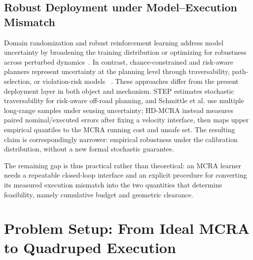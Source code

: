 \documentclass{article}
\begin{document}
\subsection{Robust Deployment under Model--Execution Mismatch}
Domain randomization and robust reinforcement learning address model uncertainty by
broadening the training distribution or optimizing for robustness across perturbed
dynamics~\citep{tobin2017,smirnova2019,wang2021,liu2022drql}. In contrast,
chance-constrained and risk-aware planners represent uncertainty at the planning
level through traversability, path-selection, or violation-risk models
~\citep{theurkauf2023,fan2021step,schmittle2024}. These approaches differ from the
present deployment layer in both object and mechanism. STEP estimates stochastic
traversability for risk-aware off-road planning, and Schmittle et al. use multiple
long-range samples under sensing uncertainty; HD-MCRA instead measures paired
nominal/executed errors after fixing a velocity interface, then maps upper empirical
quantiles to the MCRA running cost and unsafe set. The resulting claim is
correspondingly narrower: empirical robustness under the calibration distribution,
without a new formal stochastic guarantee.

The remaining gap is thus practical rather than theoretical: an MCRA learner needs
a repeatable closed-loop interface and an explicit procedure for converting its
measured execution mismatch into the two quantities that determine feasibility,
namely cumulative budget and geometric clearance.

\section{Problem Setup: From Ideal MCRA to Quadruped Execution}
\end{document}
